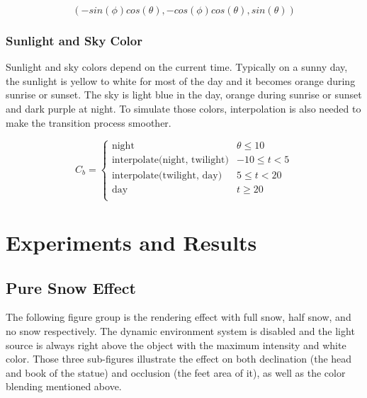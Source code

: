\documentclass{article}
\begin{document}
\[
  (-sin(\phi)cos(\theta), -cos(\phi)cos(\theta), sin(\theta))
\]

\subsubsection {Sunlight and Sky Color}
Sunlight and sky colors depend on the current time. Typically on a sunny day, the sunlight is yellow
to white for most of the day and it becomes orange during sunrise or sunset. The sky is light blue
in the day, orange during sunrise or sunset and dark purple at night. To simulate those colors, 
interpolation is also needed to make the transition process smoother. 

\[
  C_{b}=
  \left\{
    \begin{array}{ll}
      \text{night} & \theta \leq 10 \\
      \text{interpolate(night, twilight)} &  -10 \leq t < 5 \\
      \text{interpolate(twilight, day)} &  5 \leq t < 20 \\
      \text{day} & t \geq 20 \\
    \end{array} 
  \right. 
\]






\section{Experiments and Results}

\subsection {Pure Snow Effect}
The following figure group is the rendering effect with full snow, half snow, and no snow respectively.
The dynamic environment system is disabled and the light source is always right above the object with
the maximum intensity and white color. Those three sub-figures illustrate the effect on both declination 
(the head and book of the statue) and occlusion (the feet area of it), as well as the color blending
mentioned above.
\end{document}
